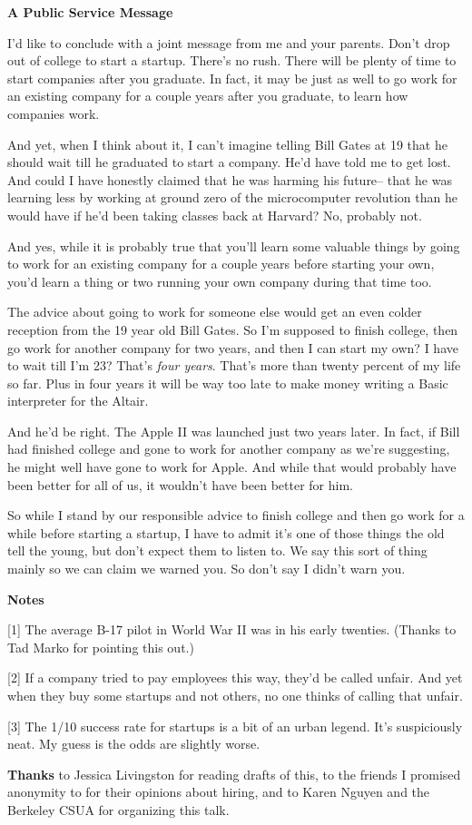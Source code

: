 \textbf{A Public Service Message}

I'd like to conclude with a joint message from me and your parents.
Don't drop out of college to start a startup. There's no rush. There
will be plenty of time to start companies after you graduate. In fact,
it may be just as well to go work for an existing company for a couple
years after you graduate, to learn how companies work.

And yet, when I think about it, I can't imagine telling Bill Gates at 19
that he should wait till he graduated to start a company. He'd have told
me to get lost. And could I have honestly claimed that he was harming
his future-- that he was learning less by working at ground zero of the
microcomputer revolution than he would have if he'd been taking classes
back at Harvard? No, probably not.

And yes, while it is probably true that you'll learn some valuable
things by going to work for an existing company for a couple years
before starting your own, you'd learn a thing or two running your own
company during that time too.

The advice about going to work for someone else would get an even colder
reception from the 19 year old Bill Gates. So I'm supposed to finish
college, then go work for another company for two years, and then I can
start my own? I have to wait till I'm 23? That's \emph{four years}.
That's more than twenty percent of my life so far. Plus in four years it
will be way too late to make money writing a Basic interpreter for the
Altair.

And he'd be right. The Apple II was launched just two years later. In
fact, if Bill had finished college and gone to work for another company
as we're suggesting, he might well have gone to work for Apple. And
while that would probably have been better for all of us, it wouldn't
have been better for him.

So while I stand by our responsible advice to finish college and then go
work for a while before starting a startup, I have to admit it's one of
those things the old tell the young, but don't expect them to listen to.
We say this sort of thing mainly so we can claim we warned you. So don't
say I didn't warn you.

\textbf{Notes}

{[}1{]} The average B-17 pilot in World War II was in his early
twenties. (Thanks to Tad Marko for pointing this out.)

{[}2{]} If a company tried to pay employees this way, they'd be called
unfair. And yet when they buy some startups and not others, no one
thinks of calling that unfair.

{[}3{]} The 1/10 success rate for startups is a bit of an urban legend.
It's suspiciously neat. My guess is the odds are slightly worse.

\textbf{Thanks} to Jessica Livingston for reading drafts of this, to the
friends I promised anonymity to for their opinions about hiring, and to
Karen Nguyen and the Berkeley CSUA for organizing this talk.
